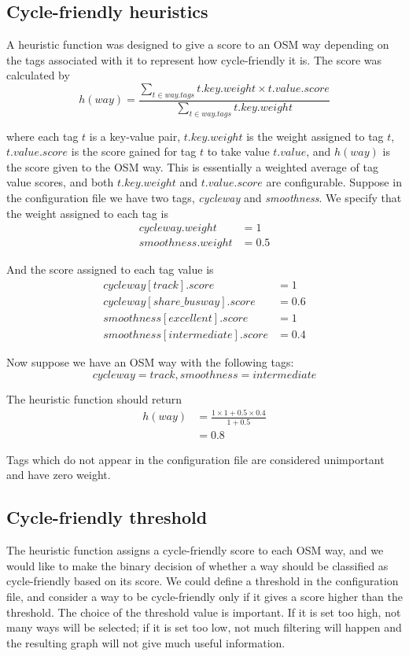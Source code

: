 \documentclass[12pt,a4paper]{report}
\begin{document}
\subsection{Cycle-friendly heuristics} \label{sec:cycle_heuristic}
A heuristic function was designed to give a score to an OSM way depending on the tags associated with it to represent how cycle-friendly it is. The score was calculated by
\begin{equation}\label{eq:heuristic}
    h(way) = \frac{\sum_{t\in way.tags} t.key.weight \times t.value.score}{\sum_{t\in way.tags} t.key.weight}
\end{equation}

where each tag $t$ is a key-value pair, $t.key.weight$ is the weight assigned to tag $t$, $t.value.score$ is the score gained for tag $t$ to take value $t.value$, and $h(way)$ is the score given to the OSM way. This is essentially a weighted average of tag value scores, and both $t.key.weight$ and $t.value.score$ are configurable. Suppose in the configuration file we have two tags, \textit{cycleway} and \textit{smoothness}. We specify that the weight assigned to each tag is
\begin{align*}
    cycleway.weight &= 1 \\
    smoothness.weight &= 0.5
\end{align*}

And the score assigned to each tag value is
\begin{align*}
    cycleway[track].score &= 1 \\
    cycleway[share\_busway].score &= 0.6 \\
    smoothness[excellent].score &= 1 \\
    smoothness[intermediate].score &= 0.4
\end{align*}

Now suppose we have an OSM way with the following tags:
\[cycleway=track, smoothness=intermediate\]

The heuristic function should return
\begin{align*}
    h(way) &= \frac{1\times 1 + 0.5\times 0.4}{1 + 0.5} \\
    &= 0.8
\end{align*}

Tags which do not appear in the configuration file are considered unimportant and have zero weight.

\subsection{Cycle-friendly threshold}
The heuristic function assigns a cycle-friendly score to each OSM way, and we would like to make the binary decision of whether a way should be classified as cycle-friendly based on its score. We could define a threshold in the configuration file, and consider a way to be cycle-friendly only if it gives a score higher than the threshold. The choice of the threshold value is important. If it is set too high, not many ways will be selected; if it is set too low, not much filtering will happen and the resulting graph will not give much useful information.
\end{document}
